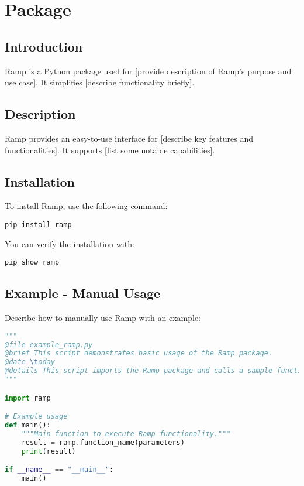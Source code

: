 %
%
%


\chapter{Package }

\section{Introduction}
Ramp is a Python package used for [provide description of Ramp's purpose and use case]. It simplifies [describe functionality briefly].

\section{Description}
Ramp provides an easy-to-use interface for [describe key features and functionalities]. It supports [list some notable capabilities].

\section{Installation}
To install Ramp, use the following command:

\begin{verbatim}
pip install ramp
\end{verbatim}

You can verify the installation with:

\begin{verbatim}
pip show ramp
\end{verbatim}

\section{Example - Manual Usage}

Describe how to manually use Ramp with an example:

\begin{lstlisting}[language=Python, caption=Basic Ramp Example]
"""
@file example_ramp.py
@brief This script demonstrates basic usage of the Ramp package.
@date \today
@details This script imports the Ramp package and calls a sample function.
"""

import ramp

# Example usage
def main():
    """Main function to execute Ramp functionality."""
    result = ramp.function_name(parameters)
    print(result)

if __name__ == "__main__":
    main()
\end{lstlisting}


